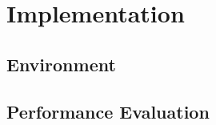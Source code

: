 \chapter{Implementation}
\label{ch:implementation}

\section{Environment}
\label{sec:environment}

\section{Performance Evaluation}
\label{sec:performance-evaluation}